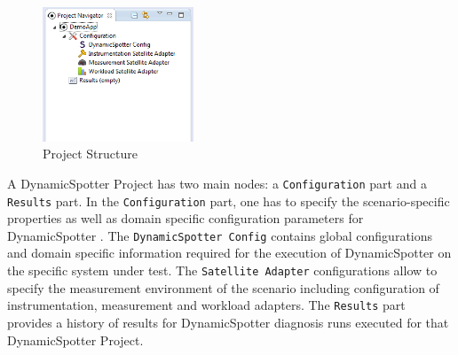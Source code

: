 \documentclass{report}
\newcommand{\DS}{DynamicSpotter }
\begin{document}
\begin{figure}[h]
\centering
\includegraphics[width=0.4\textwidth]{figures/demo/0004-navigation.png}
\caption{Project Structure}
\label{fig:projectStructure}
\end{figure}

A \DS Project has two main nodes: a \texttt{Configuration} part and a \texttt{Results} part. In the
\texttt{Configuration} part, one has to specify the scenario-specific properties as well as domain specific
configuration parameters for \DS. The \texttt{\DS Config} contains global configurations and domain specific information
required for the execution of \DS on the specific system under test. The \texttt{Satellite Adapter} configurations allow
to specify the measurement environment of the scenario including configuration of instrumentation, measurement and
workload adapters.
The \texttt{Results} part provides a history of results for \DS diagnosis runs
executed for that \DS Project.
\end{document}
